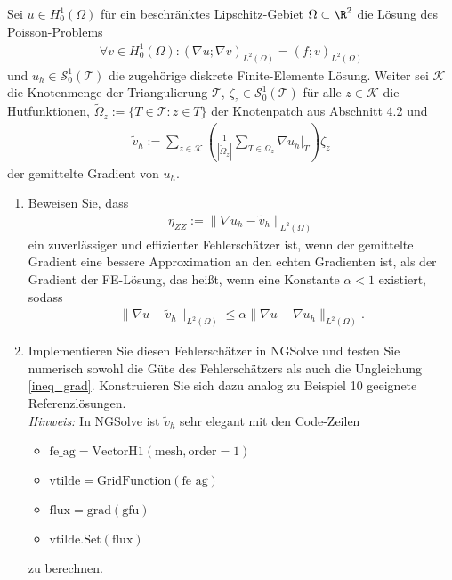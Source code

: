 
\begin{exercise}

Sei $u \in H_0^1(\Omega)$ für ein beschränktes Lipschitz-Gebiet $\Omega \subset \R^2$
die Lösung des Poisson-Problems
\begin{align}
  \forall v \in H_0^1(\Omega): (\nabla u;\nabla v)_{L^2(\Omega)} = (f;v)_{L^2(\Omega)}
\end{align}
und $u_h \in \mathcal{S}_0^1(\mathcal{T})$ die zugehörige diskrete Finite-Elemente Lösung.
Weiter sei $\mathcal{K}$ die Knotenmenge der Triangulierung $\mathcal{T}$,
$\zeta_z \in \mathcal{S}_0^1(\mathcal{T})$ für alle $z \in \mathcal{K}$ die Hutfunktionen,
$\tilde{\Omega}_z := \{T \in \mathcal{T}: z \in T\}$ der Knotenpatch aus Abschnitt 4.2 und
\begin{align}
  \tilde{v}_h := \sum_{z \in \mathcal{K}}\left(\frac{1}{|\tilde{\Omega}_z|}
  \sum_{T \in \tilde{\Omega}_z}\nabla u_h|_T\right)\zeta_z
\end{align}
der gemittelte Gradient von $u_h$.
\begin{enumerate}[label = \textbf{\alph*)}]
  \item Beweisen Sie, dass
  \begin{align}
    \eta_{ZZ} := \|\nabla u_h - \tilde{v}_h\|_{L^2(\Omega)}
  \end{align}
  ein zuverlässiger und effizienter Fehlerschätzer ist, wenn der gemittelte
  Gradient eine bessere Approximation an den echten Gradienten ist, als der
  Gradient der FE-Lösung, das heißt, wenn eine Konstante $\alpha < 1$ existiert,
  sodass
  \begin{align}
    \|\nabla u - \tilde{v}_h\|_{L^2(\Omega)} \leq \alpha\|\nabla u - \nabla u_h\|_{L^2(\Omega)}.
    \label{ineq_grad}
  \end{align}
  \item Implementieren Sie diesen Fehlerschätzer in NGSolve und testen Sie numerisch
  sowohl die Güte des Fehlerschätzers als auch die Ungleichung \eqref{ineq_grad}.
  Konstruieren Sie sich dazu analog zu Beispiel 10 geeignete Referenzlösungen. \\

  \textit{Hinweis:} In NGSolve ist $\tilde{v}_h$ sehr elegant mit den Code-Zeilen
  \begin{itemize}
    \item $\mathrm{fe\_ag = VectorH1(mesh, order = 1)}$
    \item $\mathrm{vtilde = GridFunction(fe\_ag)}$
    \item $\mathrm{flux = grad(gfu)}$
    \item $\mathrm{vtilde.Set(flux)}$
  \end{itemize}
  zu berechnen.
\end{enumerate}
\end{exercise}


\begin{solution}

\phantom{}

\end{solution}

